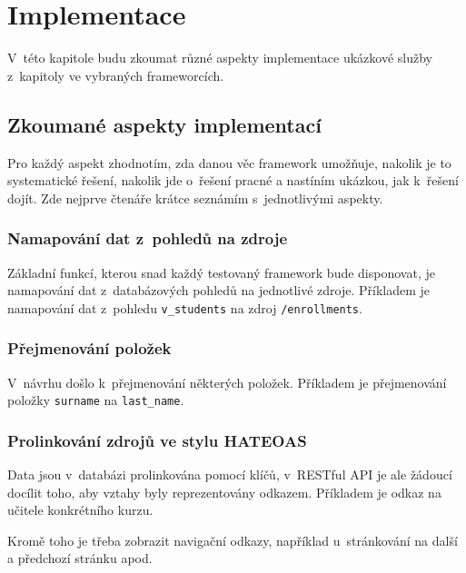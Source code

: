 \chapter{Implementace \label{implementace}}

V~této kapitole budu zkoumat různé aspekty implementace ukázkové služby z~kapitoly \emph{} ve vybraných frameworcích.

\section{Zkoumané aspekty implementací}\label{zkoumanuxe9-aspekty-implementacuxed}

Pro každý aspekt zhodnotím, zda danou věc framework umožňuje, nakolik je to systematické řešení, nakolik jde o~řešení pracné a nastíním ukázkou, jak k~řešení dojít. Zde nejprve čtenáře krátce seznámím s~jednotlivými aspekty.

\subsection{Namapování dat z~pohledů na zdroje}\label{namapovuxe1nuxed-dat-z-pohledux16f-na-zdroje}

Základní funkcí, kterou snad každý testovaný framework bude disponovat, je namapování dat z~databázových pohledů na jednotlivé zdroje. Příkladem je namapování dat z~pohledu \verb!v_students! na zdroj \verb!/enrollments!.

\subsection{Přejmenování položek}\label{pux159ejmenovuxe1nuxed-poloux17eek}

V~návrhu došlo k~přejmenování některých položek. Příkladem je přejmenování položky \verb!surname! na \verb!last_name!.

\subsection{Prolinkování zdrojů ve stylu HATEOAS}\label{prolinkovuxe1nuxed-zdrojux16f-ve-stylu-hateoas}

Data jsou v~databázi prolinkována pomocí klíčů, v~RESTful API je ale žádoucí docílit toho, aby vztahy byly reprezentovány odkazem. Příkladem je odkaz na učitele konkrétního kurzu.

Kromě toho je třeba zobrazit navigační odkazy, například u~stránkování na další a předchozí stránku apod.

